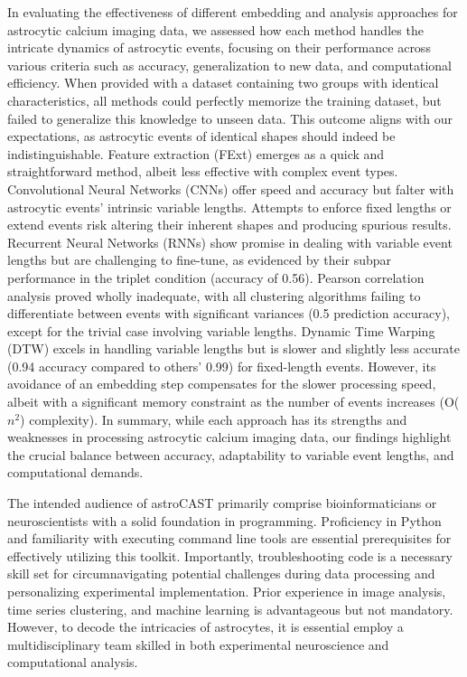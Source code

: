 In evaluating the effectiveness of different embedding and analysis approaches for astrocytic calcium imaging data, we assessed how each method handles the intricate dynamics of astrocytic events, focusing on their performance across various criteria such as accuracy, generalization to new data, and computational efficiency. When provided with a dataset containing two groups with identical characteristics, all methods could perfectly memorize the training dataset, but failed to generalize this knowledge to unseen data. This outcome aligns with our expectations, as astrocytic events of identical shapes should indeed be indistinguishable.
Feature extraction (FExt) emerges as a quick and straightforward method, albeit less effective with complex event types. Convolutional Neural Networks (CNNs) offer speed and accuracy but falter with astrocytic events' intrinsic variable lengths. Attempts to enforce fixed lengths or extend events risk altering their inherent shapes and producing spurious results. Recurrent Neural Networks (RNNs) show promise in dealing with variable event lengths but are challenging to fine-tune, as evidenced by their subpar performance in the triplet condition (accuracy of 0.56). Pearson correlation analysis proved wholly inadequate, with all clustering algorithms failing to differentiate between events with significant variances (0.5 prediction accuracy), except for the trivial case involving variable lengths. Dynamic Time Warping (DTW) excels in handling variable lengths but is slower and slightly less accurate (0.94 accuracy compared to others' 0.99) for fixed-length events. However, its avoidance of an embedding step compensates for the slower processing speed, albeit with a significant memory constraint as the number of events increases (O($n^2$) complexity).
In summary, while each approach has its strengths and weaknesses in processing astrocytic calcium imaging data, our findings highlight the crucial balance between accuracy, adaptability to variable event lengths, and computational demands.

The intended audience of astroCAST primarily comprise bioinformaticians or neuroscientists with a solid foundation in programming. Proficiency in Python and familiarity with executing command line tools are essential prerequisites for effectively utilizing this   toolkit. Importantly, troubleshooting code is a necessary skill set for circumnavigating potential challenges during data processing and personalizing experimental implementation. Prior experience in image analysis, time series clustering, and machine learning is advantageous but not mandatory. However, to decode the intricacies of astrocytes, it is essential employ a multidisciplinary team skilled in both experimental neuroscience and computational analysis.

